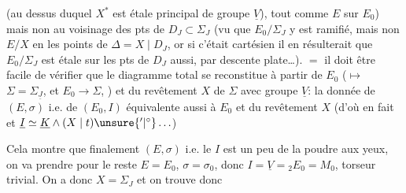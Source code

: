 (au dessus duquel $X^*$ est étale  principal de groupe $\underline V$), tout comme $E$ sur $E_0$) mais non au voisinage des pts de $D_J\subset\Sigma_J$ (vu que $E_0/\Sigma_J$ y est ramifié, mais non $E/X$ en les points de $\Delta=X\mid D_J$, or si c'était cartésien il en résulterait que $E_0/\Sigma_J$ est étale sur les pts de $D_J$ aussi, par descente plate\ldots).  $=$ il doit être facile de vérifier que le diagramme total se reconstitue à partir de $E_0$ ($\mapsto$  $\Sigma=\Sigma_{\underline J}$, et $E_0\longrightarrow\Sigma$, ) et du revêtement  $X$ de $\Sigma$ avec groupe  $\underline V$: la donnée de $(E,\sigma)$ i.e. de $(E_0,I)$   équivalente aussi à $E_0$ et du revêtement $X$ (d'où en fait  et $\underline I\simeq\underline K\wedge(X\mid t)\unsure{'|^{\circ}}\ldots$)

Cela montre que finalement $(E,\sigma)$ i.e. le $I$ est un peu de la poudre aux yeux, on va prendre pour le reste $E=E_0$, $\sigma=\sigma_0$, donc $I=\underline V={}_2E_0=M_0$, torseur trivial. On a donc  $X=\Sigma_J$ et on trouve donc

